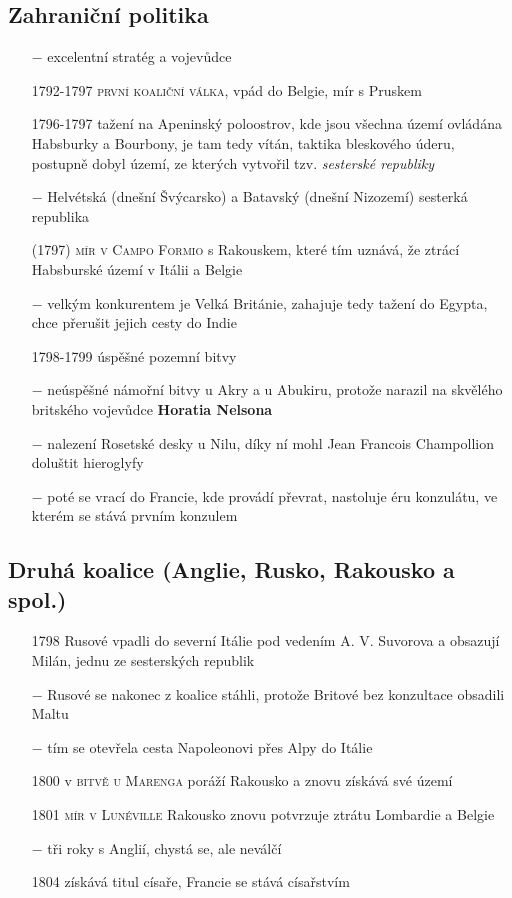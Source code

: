 \documentclass{article}
\begin{document}
\subsection*{Zahraniční politika}
\begin{itemize}
    \vspace{-0.5em}
    \setlength\itemsep{0.15em}
    \item[$-$] excelentní stratég a vojevůdce
    \item[1792-1797] \textsc{první koaliční válka}, vpád do Belgie, mír s Pruskem
    \item[1796-1797] tažení na Apeninský poloostrov, kde jsou všechna území ovládána Habsburky a Bourbony, je tam tedy vítán, taktika bleskového úderu, postupně dobyl území, ze kterých vytvořil tzv. \textit{sesterské republiky}
    \item[$-$] Helvétská (dnešní Švýcarsko) a Batavský (dnešní Nizozemí) sesterká republika
    \item[(1797)] \textsc{mír v Campo Formio} s Rakouskem, které tím uznává, že ztrácí Habsburské území v Itálii a Belgie
    \item[$-$] velkým konkurentem je Velká Británie, zahajuje tedy tažení do Egypta, chce přerušit jejich cesty do Indie
    \item[1798-1799] úspěšné pozemní bitvy
    \item[$-$] neúspěšné námořní bitvy u Akry a u Abukiru, protože narazil na skvělého britského vojevůdce \textbf{Horatia Nelsona}
    \item[$-$] nalezení Rosetské desky u Nilu, díky ní mohl Jean Francois Champollion doluštit hieroglyfy
    \item[$-$] poté se vrací do Francie, kde provádí převrat, nastoluje éru konzulátu, ve kterém se stává prvním konzulem
\end{itemize}

\subsection*{Druhá koalice (Anglie, Rusko, Rakousko a spol.)}
\begin{itemize}
    \vspace{-0.5em}
    \setlength\itemsep{0.15em}
    \item[1798] Rusové vpadli do severní Itálie pod vedením A. V. Suvorova a obsazují Milán, jednu ze sesterských republik
    \item[$-$] Rusové se nakonec z koalice stáhli, protože Britové bez konzultace obsadili Maltu
    \item[$-$] tím se otevřela cesta Napoleonovi přes Alpy do Itálie
    \item[1800] v \textsc{bitvě u Marenga} poráží Rakousko a znovu získává své území
    \item[1801] \textsc{mír v Lunéville} Rakousko znovu potvrzuje ztrátu Lombardie a Belgie
    \item[$-$] tři roky  s Anglií, chystá se, ale neválčí
    \item[1804] získává titul císaře, Francie se stává císařstvím
\end{itemize}
\end{document}
